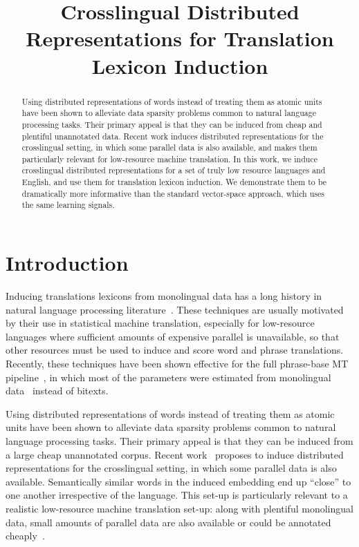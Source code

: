 \documentclass[11pt,letterpaper]{article}
\title{Crosslingual Distributed Representations for Translation Lexicon Induction}
\date{}
\begin{document}
\maketitle
\begin{abstract}
Using distributed representations of words instead of treating them as atomic units have been shown to alleviate data sparsity problems common to natural language processing tasks.  Their primary appeal is that they can be induced from cheap and plentiful unannotated data.  Recent work induces distributed representations for the crosslingual setting, in which some parallel data is also available, and makes them particularly relevant for low-resource machine translation.  In this work, we induce crosslingual distributed representations for a set of truly low resource languages and English, and use them for translation lexicon induction.  We demonstrate them to be dramatically more informative than the standard vector-space approach, which uses the same learning signals.
\end{abstract}

\section{Introduction} \label{sect:intro}
Inducing translations lexicons from monolingual data has a long history in natural language processing literature~\cite{Rapp:1995;Fung:1998;Schafer:2002;Koehn:2002;Garera:2009}.  These techniques are usually motivated by their use in statistical machine translation, especially for low-resource languages where sufficient amounts of expensive parallel is unavailable, so that other resources must be used to induce and score word and phrase translations.  Recently, these techniques have been shown effective for the full phrase-base MT pipeline~\cite{koehn03phrasebased}, in which most of the parameters were estimated from monolingual data~\cite{eacl12} instead of bitexts.

Using distributed representations of words instead of treating them as atomic units have been shown to alleviate data sparsity problems common to natural language processing tasks.  Their primary appeal is that they can be induced from a large cheap unannotated corpus.  Recent work~\cite{Klementiev-et-al:COLING2012} proposes to induce distributed representations for the crosslingual setting, in which some parallel data is also available.  Semantically similar words in the induced embedding end up ``close'' to one another irrespective of the language.  This set-up is particularly relevant to a realistic low-resource machine translation set-up: along with plentiful monolingual data, small amounts of parallel data are also available or could be annotated cheaply~\cite{AnMTurkPaper}.
\end{document}
